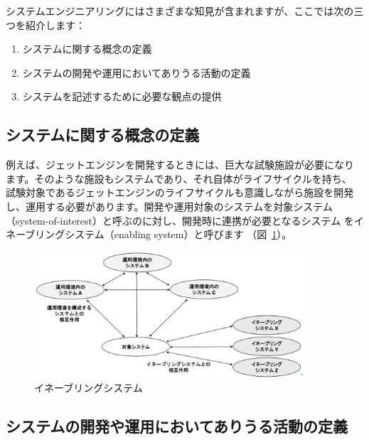システムエンジニアリングにはさまざまな知見が含まれますが、ここでは次の三つを紹介します：

\begin{enumerate}
    \item システムに関する概念の定義
    \item システムの開発や運用においてありうる活動の定義
    \item システムを記述するために必要な観点の提供
\end{enumerate}

\subsection{システムに関する概念の定義}

例えば、ジェットエンジンを開発するときには、巨大な試験施設が必要になり
ます。そのような施設もシステムであり、それ自体がライフサイクルを持ち、
試験対象であるジェットエンジンのライフサイクルも意識しながら施設を開発
し、運用する必要があります。開発や運用対象のシステムを対象システム
（system-of-interest）と呼ぶのに対し、開発時に連携が必要となるシステム
をイネーブリングシステム（enabling system）と呼びます
（図~\ref{figure:ch4-1}）。
\begin{figure}
    \begin{center}
    \includegraphics[width=100mm,bb=0 0 622 293]{safety_assurance_contents/ch4images/fig1.png}
    \caption{イネーブリングシステム}
    \label{figure:ch4-1}
    \end{center}
\end{figure}

\subsection{システムの開発や運用においてありうる活動の定義}

